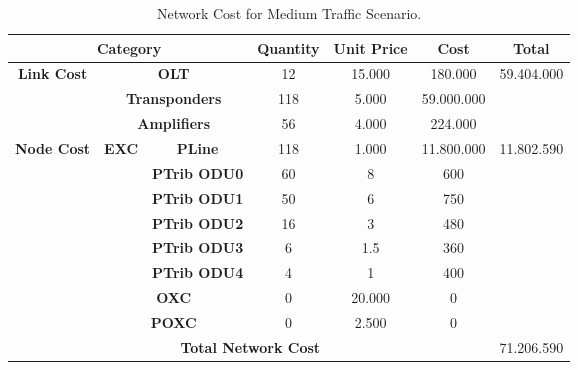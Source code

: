 \begin{table}[H]
\centering
\label{opaque_medium_traffic}
\begin{tabular}{|c|c|c|c|c|c|c|}
\hline
\multicolumn{3}{|c|}{\textbf{Category}}                                                   & \textbf{Quantity} & \textbf{Unit Price} & \textbf{Cost} & \textbf{Total}              \\ \hline
\multirow{3}{*}{\textbf{Link Cost}} & \multicolumn{2}{c|}{\textbf{OLT}}                   & 12                & 15.000              & 180.000       & \multirow{3}{*}{59.404.000} \\ \cline{2-6}
                                    & \multicolumn{2}{c|}{\textbf{Transponders}}          & 118               & 5.000               & 59.000.000    &                             \\ \cline{2-6}
                                    & \multicolumn{2}{c|}{\textbf{Amplifiers}}            & 56                & 4.000               & 224.000       &                             \\ \hline
\multirow{8}{*}{\textbf{Node Cost}} & \multirow{6}{*}{\textbf{EXC}} & \textbf{PLine}      & 118               & 1.000                & 11.800.000    & \multirow{8}{*}{11.802.590} \\ \cline{3-6}
                                    &                               & \textbf{PTrib ODU0} & 60                & 8                   & 600           &                             \\ \cline{3-6}
                                    &                               & \textbf{PTrib ODU1} & 50                & 6                   & 750           &                             \\ \cline{3-6}
                                    &                               & \textbf{PTrib ODU2} & 16                & 3                   & 480           &                             \\ \cline{3-6}
                                    &                               & \textbf{PTrib ODU3} & 6                 & 1.5                 & 360           &                             \\ \cline{3-6}
                                    &                               & \textbf{PTrib ODU4} & 4                 & 1                   & 400           &                             \\ \cline{2-6}
                                    & \multicolumn{2}{c|}{\textbf{OXC}}                   & 0                 & 20.000              & 0             &                             \\ \cline{2-6}
                                    & \multicolumn{2}{c|}{\textbf{POXC}}                  & 0                 & 2.500               & 0             &                             \\ \hline
\multicolumn{6}{|c|}{\textbf{Total Network Cost}}                                                                                                   & 71.206.590                  \\ \hline
\end{tabular}
\caption{Network Cost for Medium Traffic Scenario.}
\end{table}

